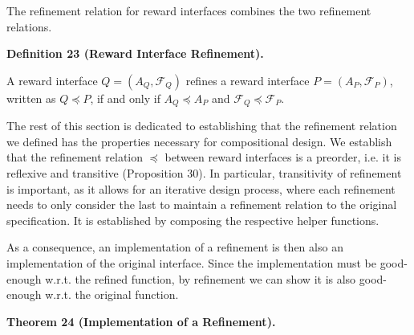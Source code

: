  
 
 
The refinement relation for reward interfaces combines the two refinement relations.\par
 
 
 
\par\medskip\noindent\textbf{Definition 23 (Reward Interface Refinement).}\par
 
 
A reward interface $Q=(A_{Q},\mathcal{F}_{Q})$ refines a reward interface $P=(A_{P},\mathcal{F}_{P})$, written as $Q\preceq P$, if and only if $A_{Q}\preceq A_{P}$ and $\mathcal{F}_{Q}\preceq\mathcal{F}_{P}$.\par
 
 
 
 
The rest of this section is dedicated to establishing that the refinement relation we defined has the properties necessary for compositional design. We establish that the refinement relation $\preceq$ between reward interfaces is a preorder, i.e. it is reflexive and transitive (Proposition 30). In particular, transitivity of refinement is important, as it allows for an iterative design process, where each refinement needs to only consider the last to maintain a refinement relation to the original specification. It is established by composing the respective helper functions.\par
 
 
 
As a consequence, an implementation of a refinement is then also an implementation of the original interface. Since the implementation must be good-enough w.r.t. the refined function, by refinement we can show it is also good-enough w.r.t. the original function.\par
 
 
 
\par\medskip\noindent\textbf{Theorem 24 (Implementation of a Refinement).}\par
 

